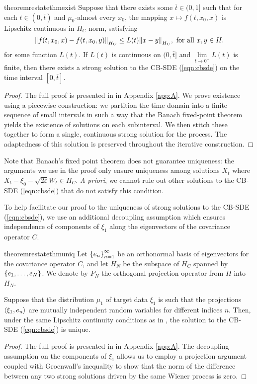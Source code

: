 \begin{restatable}{theorem}{restatethmexist} \label{thm:exist}
  Suppose that there exists some \(\overline{t} \in (0, 1]\) such that for each \(t \in (0, \overline{t})\) and \(\mu_{0}\)-almost every \(x_{0}\), the mapping \(x \mapsto f(t, x_{0}, x)\) is Lipschitz continuous in \(H_{C}\) norm, satisfying
  \[
    \norm{f(t, x_{0}, x) - f(t, x_{0}, y)}_{H_{C}} \leq L(t) \norm{x - y}_{H_{C}}, \text{ for all } x, y \in H.
  \]
  for some function \(L(t)\). If \(L(t)\) is continuous on \((0, \overline{t}]\) and \(\lim\limits_{t \to 0^{+}} L(t) \) is finite, then there exists a strong solution to the CB-SDE (\ref{eqn:cbsde}) on the time interval \([0, \overline{t}]\).
\end{restatable}
\begin{proof}
  The full proof is presented in  in Appendix \ref{app:A}. We prove existence using a piecewise construction: we partition the time domain into a finite sequence of small intervals in such a way that the Banach fixed-point theorem  yields the existence of solutions on each subinterval. We then stitch these together to form a single, continuous strong solution for the process. The adaptedness of this solution is preserved throughout the iterative construction.
\end{proof}

Note that Banach's fixed point theorem does not guarantee uniqueness: the arguments we use in the proof only ensure uniqueness among solutions \(X_{t}\) where \(X_{t} - \xi_{0} - \sqrt{2\varepsilon} W_{t} \in H_{C}\). \textit{A priori}, we cannot  rule out  other solutions to the CB-SDE (\ref{eqn:cbsde}) that do not satisfy this condition.

To help facilitate our proof to the uniqueness of strong solutions to the CB-SDE (\ref{eqn:cbsde}), we use an additional decoupling assumption which ensures independence of components of \(\xi_{1}\) along the eigenvectors of the covariance operator \(C\).

\begin{restatable}{theorem}{restatethmuniq}\label{thm:uniq}
  Let \(\qty{e_{n}}_{n=1}^{\infty}\) be an orthonormal basis of eigenvectors for the covariance operator \(C\), and let \(H_{N}\) be the subspace of \(H_{C}\) spanned by \(\qty{e_{1}, \ldots, e_{N}}\). We denote by \(P_{N}\) the orthogonal projection operator from \(H\) into \(H_{N}\).

  Suppose that the distribution \(\mu_{1}\) of target data \(\xi_{1}\) is such that the projections \(\ev{\xi_{1}, e_{n}}\) are mutually independent random variables for different indices \(n\). Then, under the same Lipschitz continuity conditions as in , the solution to the CB-SDE (\ref{eqn:cbsde}) is unique.
\end{restatable}
\begin{proof}
  The full proof is presented in  in Appendix \ref{app:A}. The decoupling assumption on the components of \(\xi_{1}\) allows us to employ a projection argument coupled with Groenwall's inequality to show that the norm of the difference between any two strong solutions driven by the same Wiener process is zero.
\end{proof}

